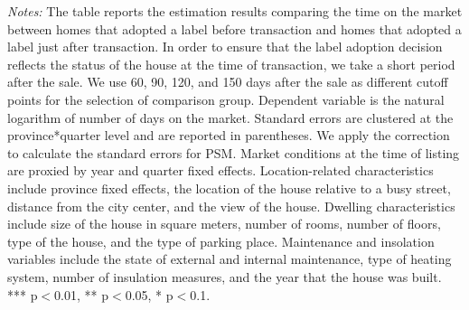\documentclass[12pt]{article}
\begin{document}
\begin{table}[H]
\begin{tabular}{lcccc}
    \end{tabular}%
\begin{tablenotes}
\scriptsize
\item \textit{Notes:} The table reports the estimation results comparing the time on the market between homes that adopted a label before transaction and homes that adopted a label just after transaction. In order to ensure that the label adoption decision reflects the status of the house at the time of transaction, we take a short period after the sale. We use 60, 90, 120, and 150 days after the sale as different cutoff points for the selection of comparison group. Dependent variable is the natural logarithm of number of days on the market. Standard errors are clustered at the province*quarter level and are reported in parentheses. We apply the \citep{abadie2016matching} correction to calculate the standard errors for PSM. Market conditions at the time of listing are proxied by year and quarter fixed effects. Location-related characteristics include province fixed effects, the location of the house relative to a busy street, distance from the city center, and the view of the house. Dwelling characteristics include size of the house in square meters, number of rooms, number of floors, type of the house, and the type of parking place. Maintenance and insolation variables include the state of external and internal maintenance, type of heating system, number of insulation measures, and the year that the house was built. *** p$<$0.01, ** p$<$0.05, * p$<$0.1. 
\end{tablenotes}

  \label{tab:addlabel}%
\end{table}%
\end{document}
